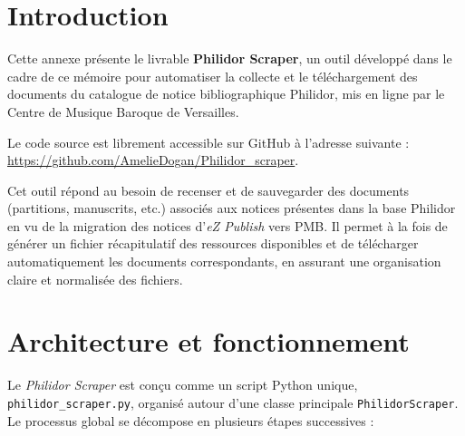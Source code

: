 \section*{Introduction}

Cette annexe présente le livrable \textbf{Philidor Scraper}, un outil développé dans le cadre de ce mémoire pour automatiser la collecte et le téléchargement des documents du catalogue de notice bibliographique Philidor, mis en ligne par le Centre de Musique Baroque de Versailles. 

Le code source est librement accessible sur GitHub à l'adresse suivante : 
\url{https://github.com/AmelieDogan/Philidor_scraper}. 

Cet outil répond au besoin de recenser et de sauvegarder des documents (partitions, manuscrits, etc.) associés aux notices présentes dans la base Philidor en vu de la migration des notices d'\textit{eZ Publish} vers PMB. 
Il permet à la fois de générer un fichier récapitulatif des ressources disponibles et de télécharger automatiquement les documents correspondants, en assurant une organisation claire et normalisée des fichiers.

\section*{Architecture et fonctionnement}
Le \textit{Philidor Scraper} est conçu comme un script Python unique, \texttt{philidor\_scraper.py}, organisé autour d'une classe principale \texttt{PhilidorScraper}.  
Le processus global se décompose en plusieurs étapes successives :


